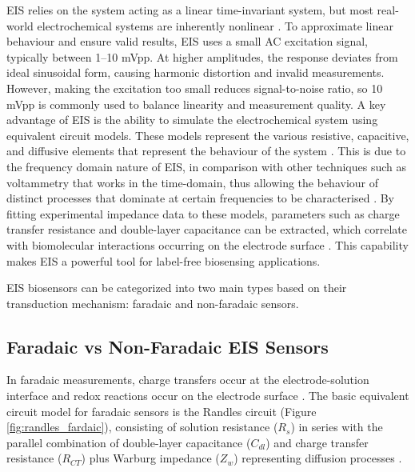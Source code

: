 \Ac{EIS} relies on the system acting as a linear time-invariant system, but most real-world electrochemical systems are inherently nonlinear \cite{lazanasErratumElectrochemicalImpedance2025}. To approximate linear behaviour and ensure valid results, EIS uses a small AC excitation signal, typically between 1–10 mVpp\cite{EISQualityIndicators}\cite{lazanasErratumElectrochemicalImpedance2025}. At higher amplitudes, the response deviates from ideal sinusoidal form, causing harmonic distortion and invalid measurements. However, making the excitation too small reduces signal-to-noise ratio, so 10 mVpp is commonly used to balance linearity and measurement quality.  
A key advantage of \ac{EIS} is the ability to simulate the electrochemical system using equivalent circuit models. These models represent the various resistive, capacitive, and diffusive elements that represent the behaviour of the system \cite{lazanasErratumElectrochemicalImpedance2025}. This is due to the frequency domain nature of EIS, in comparison with other techniques such as voltammetry that works in the time-domain, thus allowing the behaviour of distinct processes that dominate at certain frequencies to be characterised \cite{lazanasErratumElectrochemicalImpedance2025}. By fitting experimental impedance data to these models, parameters such as charge transfer resistance and double-layer capacitance can be extracted, which correlate with biomolecular interactions occurring on the electrode surface \cite{danielsLabelFreeImpedanceBiosensors2007}. This capability makes \ac{EIS} a powerful tool for label-free biosensing applications. 

EIS biosensors can be categorized into two main types based on their transduction mechanism: faradaic and non-faradaic sensors.

\subsection{Faradaic vs Non-Faradaic EIS Sensors}\label{subsec:lit_review_eis_sensors}
In faradaic measurements, charge transfers occur at the electrode-solution interface and redox reactions occur on the electrode surface \cite{xieReviewAdvancementsNanoscale2020a}. The basic equivalent circuit model for faradaic sensors is the Randles circuit (Figure \ref{fig:randles_fardaic}), consisting of solution resistance ($R_s$) in series with the parallel combination of double-layer capacitance ($C_{dl}$) and charge transfer resistance ($R_{CT}$) plus Warburg impedance ($Z_w$) representing diffusion processes \cite{xieReviewAdvancementsNanoscale2020a}.

